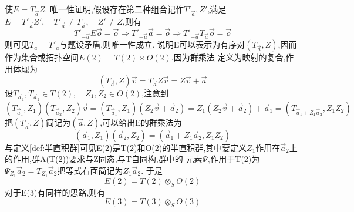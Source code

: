 \documentclass[../main.tex]{subfiles}
\begin{document}
使$E = T_{\vec{a}}Z$.
唯一性证明,假设存在第二种组合记作$T'_{\vec{a}},Z'$,满足$E = T'_{\vec{a}}Z',\quad T'_{\vec{a}}\ne T_{\vec{a}},\quad Z'\ne Z$,则有
\begin{equation*}
    T'_{-\vec{a}} E \vec{o} = \vec{o} \Rightarrow
    T'_{-\vec{a}} \vec{a} = \vec{o} \Rightarrow
    T'_{-\vec{a}}T_{\vec{a}}\vec{o} = \vec{o}
\end{equation*}
则可见$T_{a} = T'_{a}$与题设矛盾,则唯一性成立.
说明E可以表示为有序对$(T_{\vec{a}},Z)$,因而作为集合或拓扑空间$E(2) = T(2)\times O(2)$.因为群乘法
定义为映射的复合,作用体现为
$$(T_{\vec{a}},Z)\vec{v} = T_{\vec{a}}Z\vec{v} = Z\vec{v} +\vec{a}$$
设$T_{\vec{a}_1},T_{\vec{a}_2} \in T(2),\quad Z_1,Z_2 \in O(2)$,注意到
$$(T_{\vec{a}_1},Z_1)(T_{\vec{a}_2},Z_2)\vec{v} = (T_{\vec{a}_1},Z_1)(Z_2\vec{v} + \vec{a}_2) = Z_1(Z_2\vec{v} + \vec{a}_2) + \vec{a}_1 = (T_{\vec{a}_1 + Z_1\vec{a}_2},Z_1Z_2)$$
把$(T_{\vec{a}},Z)$简记为$(\vec{a},Z)$,可以给出E的群乘法为
$$(\vec{a}_1,Z_1)(\vec{a}_2,Z_2) = (\vec{a}_1 + Z_1\vec{a}_2,Z_1Z_2)$$
与定义\ref{def:半直积群}可见E(2)是T(2)和O(2)的半直积群,其中要定义$Z_1$作用在$\vec{a}_2$上的作用,群A(T(2))要求与Z同态,与T自同构,群中的
元素$\Psi_z$作用于T(2)为$\Psi_{Z_1}\vec{a}_2 = T_{Z_1}\vec{a}_2$把等式右面简记为$Z_1\vec{a}_2$.
于是$$E(2) = T(2) \otimes_S O(2)$$
对于E(3)有同样的思路,则有$$E(3) = T(3) \otimes_S O(3)$$
\end{document}
